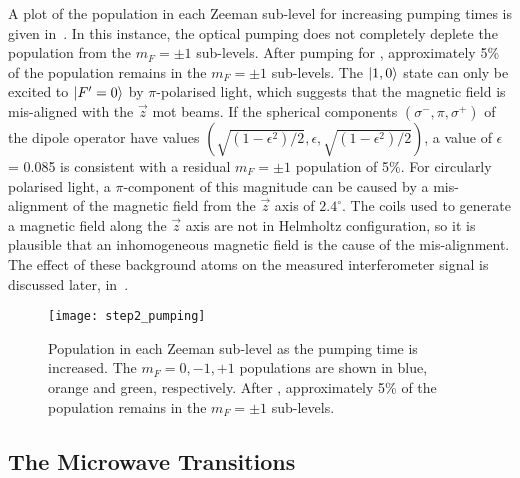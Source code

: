 \par\noindent
A plot of the population in each Zeeman sub-level for increasing
pumping times is given in~. In this
instance, the optical pumping does not completely deplete the
population from the \(m_F = \pm 1\) sub-levels. After pumping for
, approximately 5\% of the population
remains in the \(m_F = \pm 1\) sub-levels. The \(\ket{1,0}\) state can
only be excited to \(\ket{F'=0}\) by \(\pi\)-polarised light, which
suggests that the magnetic field is mis-aligned with the \(\vec{z}\)
\ac{mot} beams. If the spherical components $(\sigma^-,\pi,\sigma^+)$
of the dipole operator have values
$(\sqrt{(1-\epsilon^2)/2},\epsilon,
\sqrt{(1-\epsilon^2)/2})$, a value of $\epsilon$ = 0.085 is consistent
with a residual $m_F = \pm 1$ population of 5\%. For circularly
polarised light, a $\pi$-component of this magnitude can be caused by
a mis-alignment of the magnetic field from the $\vec{z}$ axis of
$2.4^\circ$. The coils used to generate a magnetic field along the
$\vec{z}$ axis are not in Helmholtz configuration, so it is plausible
that an inhomogeneous magnetic field is the cause of the
mis-alignment. The effect of these background atoms on the measured
interferometer signal is discussed later,
in~.
\begin{figure}[!htbp]
    \centering
    \texttt{[image: step2\_pumping]}
    \caption[\(\ket{1,m_F}\) populations for increasing  pumping time.]{Population in each Zeeman sub-level as the  pumping time is increased. The \(m_F = 0, -1, +1\) populations are shown in blue, orange and green, respectively. After , approximately 5\% of the population remains in the \(m_F = \pm 1\) sub-levels.}
    \label{fig:step2_pumping}
\end{figure}
\subsection{The Microwave Transitions}\label{subsec:microwaves}
